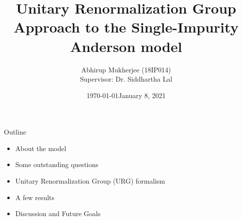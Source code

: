 \documentclass[aspectratio=169]{beamer}
\title{Unitary Renormalization Group Approach to the Single-Impurity Anderson model}
\subtitle{}
\date{\today}
\author{Abhirup Mukherjee (18IP014)\\[5mm]{Supervisor: Dr. Siddhartha Lal}}
\institute{IISER Kolkata}
\date{January 8, 2021}
\begin{document}
\begin{frame}
\maketitle
\end{frame}

\begin{frame}{Outline}

\begin{itemize}
  \item About the model
	  \vspace*{10pt}
  \item Some outstanding questions
	  \vspace*{10pt}
  \item Unitary Renormalization Group (URG) formalism
	  \vspace*{10pt}
  \item A few results 
	  \vspace*{10pt}
  \item Discussion and Future Goals
\end{itemize}

\end{frame}
\end{document}
